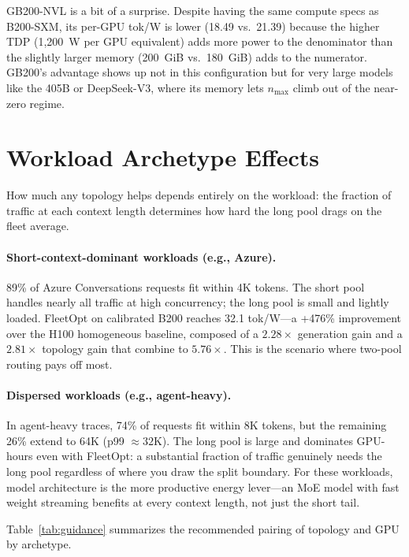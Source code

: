 \documentclass[11pt,a4paper]{article}
\newcommand{\nmax}{n_{\max}}
\begin{document}
GB200-NVL is a bit of a surprise.  Despite having the same compute specs as
B200-SXM, its per-GPU tok/W is lower (18.49 vs.\ 21.39) because the higher
TDP (1{,}200~W per GPU equivalent) adds more power to the denominator than
the slightly larger memory (200~GiB vs.\ 180~GiB) adds to the numerator.
GB200's advantage shows up not in this configuration but for very large models
like the 405B or DeepSeek-V3, where its memory lets $\nmax$ climb out of
the near-zero regime.

\section{Workload Archetype Effects}
\label{sec:archetypes}

How much any topology helps depends entirely on the workload: the fraction of
traffic at each context length determines how hard the long pool drags on the
fleet average.

\paragraph{Short-context-dominant workloads (e.g., Azure).}
89\% of Azure Conversations requests fit within 4K tokens.  The short pool
handles nearly all traffic at high concurrency; the long pool is small and
lightly loaded.  FleetOpt on calibrated B200 reaches 32.1 tok/W---a +476\%
improvement over the H100 homogeneous baseline, composed of a $2.28\times$
generation gain and a $2.81\times$ topology gain that combine to $5.76\times$.
This is the
scenario where two-pool routing pays off most.

\paragraph{Dispersed workloads (e.g., agent-heavy).}
In agent-heavy traces, 74\% of requests fit within 8K tokens, but the
remaining 26\% extend to 64K (p99 $\approx 32$K).  The long pool is large and
dominates GPU-hours even with FleetOpt: a substantial fraction of traffic
genuinely needs the long pool regardless of where you draw the split boundary.
For these workloads, model architecture is the more productive energy
lever---an MoE model with fast weight streaming benefits at every context
length, not just the short tail.

Table~\ref{tab:guidance} summarizes the recommended pairing of topology and
GPU by archetype.
\end{document}
